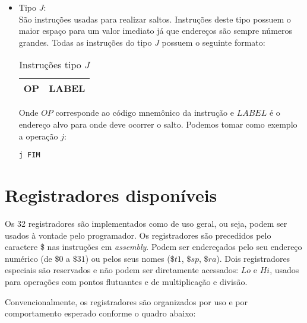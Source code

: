 \begin{itemize}
\item Tipo $J$:\\
São instruções usadas para realizar saltos. Instruções deste tipo possuem o maior espaço para um valor imediato já que endereços são sempre números grandes. Todas as instruções do tipo $J$ possuem o seguinte formato:\\

\begin{table}[h]
\centering
\caption{Instruções tipo $J$}
\label{tab:tipo_j}
\begin{tabular}{@{}|l|l|@{}}
\toprule 
OP & LABEL
 \\ \bottomrule
\end{tabular}
\end{table}

Onde $OP$ corresponde ao código mnemônico da instrução e $LABEL$ é o endereço alvo para onde deve ocorrer o salto. Podemos tomar como exemplo a operação $j$:\\

\begin{verbatim}
j FIM
\end{verbatim}
\end{itemize}
\vspace{0.5cm}

\section{Registradores disponíveis}

Os 32 registradores são implementados como de uso geral, ou seja, podem ser usados à vontade pelo programador. Os registradores são precedidos pelo caractere \$ nas instruções em \textit{assembly}. Podem ser endereçados pelo seu endereço numérico (de $\$0$ a $\$31$) ou pelos seus nomes ($\$t1$, $\$sp$, $\$ra$). Dois registradores especiais são reservados e não podem ser diretamente acessados: $Lo$ e $Hi$, usados para operações com pontos flutuantes e de multiplicação e divisão.

Convencionalmente, os registradores são organizados por uso e por comportamento esperado conforme o quadro abaixo:\\

